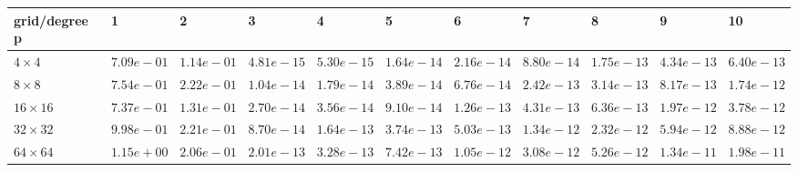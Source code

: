 \begin{tabular}{lllllllllll}
\hline
 grid/degree p   & 1          & 2          & 3          & 4          & 5          & 6          & 7          & 8          & 9          & 10         \\
\hline
 $4 \times 4$    & $7.09e-01$ & $1.14e-01$ & $4.81e-15$ & $5.30e-15$ & $1.64e-14$ & $2.16e-14$ & $8.80e-14$ & $1.75e-13$ & $4.34e-13$ & $6.40e-13$ \\
 $8 \times 8$    & $7.54e-01$ & $2.22e-01$ & $1.04e-14$ & $1.79e-14$ & $3.89e-14$ & $6.76e-14$ & $2.42e-13$ & $3.14e-13$ & $8.17e-13$ & $1.74e-12$ \\
 $16 \times 16$  & $7.37e-01$ & $1.31e-01$ & $2.70e-14$ & $3.56e-14$ & $9.10e-14$ & $1.26e-13$ & $4.31e-13$ & $6.36e-13$ & $1.97e-12$ & $3.78e-12$ \\
 $32 \times 32$  & $9.98e-01$ & $2.21e-01$ & $8.70e-14$ & $1.64e-13$ & $3.74e-13$ & $5.03e-13$ & $1.34e-12$ & $2.32e-12$ & $5.94e-12$ & $8.88e-12$ \\
 $64 \times 64$  & $1.15e+00$ & $2.06e-01$ & $2.01e-13$ & $3.28e-13$ & $7.42e-13$ & $1.05e-12$ & $3.08e-12$ & $5.26e-12$ & $1.34e-11$ & $1.98e-11$ \\
\hline
\end{tabular}